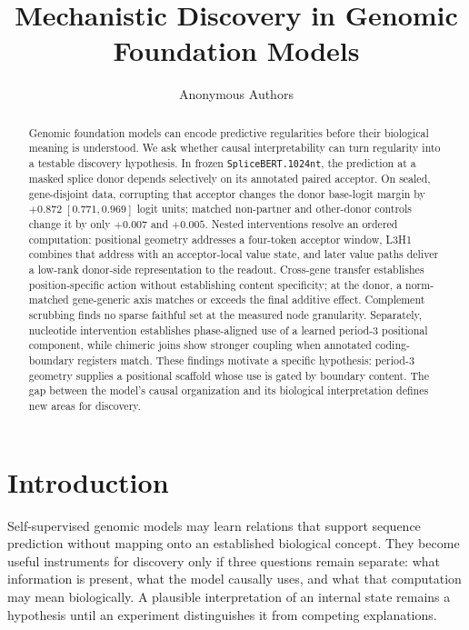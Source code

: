 \documentclass{article}
\title{Mechanistic Discovery in Genomic Foundation Models}
\author{Anonymous Authors}
\begin{document}
\maketitle

\begin{abstract}
Genomic foundation models can encode predictive regularities before their biological meaning is understood. We ask whether causal interpretability can turn regularity into a testable discovery hypothesis. In frozen \texttt{SpliceBERT.1024nt}, the prediction at a masked splice donor depends selectively on its annotated paired acceptor. On sealed, gene-disjoint data, corrupting that acceptor changes the donor base-logit margin by \(+0.872\;[0.771,0.969]\) logit units; matched non-partner and other-donor controls change it by only \(+0.007\) and \(+0.005\). Nested interventions resolve an ordered computation: positional geometry addresses a four-token acceptor window, L3H1 combines that address with an acceptor-local value state, and later value paths deliver a low-rank donor-side representation to the readout. Cross-gene transfer establishes position-specific action without establishing content specificity; at the donor, a norm-matched gene-generic axis matches or exceeds the final additive effect. Complement scrubbing finds no sparse faithful set at the measured node granularity. Separately, nucleotide intervention establishes phase-aligned use of a learned period-3 positional component, while chimeric joins show stronger coupling when annotated coding-boundary registers match. These findings motivate a specific hypothesis: period-3 geometry supplies a positional scaffold whose use is gated by boundary content. The gap between the model's causal organization and its biological interpretation defines new areas for discovery.
\end{abstract}

\section{Introduction}
\label{sec:introduction}

Self-supervised genomic models may learn relations that support sequence prediction without mapping onto an established biological concept. They become useful instruments for discovery only if three questions remain separate: what information is present, what the model causally uses, and what that computation may mean biologically. A plausible interpretation of an internal state remains a hypothesis until an experiment distinguishes it from competing explanations.
\end{document}
